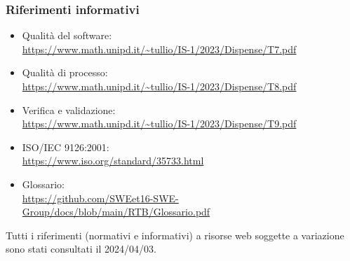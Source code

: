\subsubsection{Riferimenti informativi}
\begin{itemize}
    \item Qualità del software: \\
    \url{https://www.math.unipd.it/~tullio/IS-1/2023/Dispense/T7.pdf}
    \item Qualità di processo:\\
    \url{https://www.math.unipd.it/~tullio/IS-1/2023/Dispense/T8.pdf}
    \item Verifica e validazione: \\
    \url{https://www.math.unipd.it/~tullio/IS-1/2023/Dispense/T9.pdf}
    \item ISO/IEC 9126:2001: \\
    \url{https://www.iso.org/standard/35733.html}
    \item Glossario: \\
    \url{https://github.com/SWEet16-SWE-Group/docs/blob/main/RTB/Glossario.pdf} 
\end{itemize}

Tutti i riferimenti (normativi e informativi) a risorse web soggette a variazione sono stati consultati il 2024/04/03.

